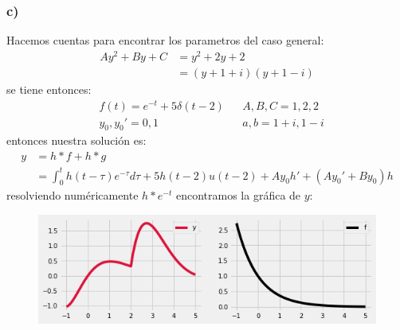 \documentclass{article}
\begin{document}
\begin{tcolorbox}[breakable]
    \subsubsection*{c)}
    Hacemos cuentas para encontrar los parametros del caso general:
    \begin{align*}
        Ay^2 + By + C 
        &= y^2 + 2y + 2 \\
        &= (y+1+i)(y+1-i)
    \end{align*}
    se tiene entonces:
    \begin{align*}
        &f(t) = e^{-t} + 5\delta(t-2)
        &&A, B, C = 1, 2, 2 \\ 
        &y_0, y_0' = 0,1
        &&a,b = 1+i, 1-i   
    \end{align*}    
    entonces nuestra solución es:
    \begin{align*}
        y
        &= h*f + h*g \\
        &= \int_{0}^t h(t-\tau)e^{-\tau}d\tau + 5h(t-2)u(t-2)  + Ay_0h' + (Ay_0'+By_0)h 
    \end{align*}
    resolviendo numéricamente $h*e^{-t}$ encontramos la gráfica de $y$:
    \begin{figure}[H]
        \centering
        \includegraphics[scale=0.7]{images/p1_3.png}
    \end{figure}


\end{tcolorbox}
\end{document}
